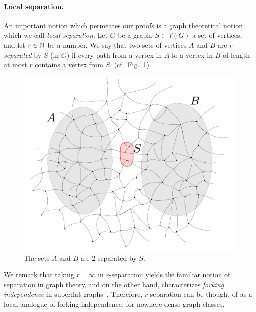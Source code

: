 \paragraph{Local separation.}
An important notion which permeates our proofs
is a graph theoretical notion which we call \emph{local separation}.
Let $G$ be a graph, $S\subset V(G)$ a set of vertices,
and let $r\in \mathbb{N}$ be a number. We say that two  sets of vertices $A$ and $B$  are \emph{$r$-separated} by $S$ (in $G$) if every path from a vertex in $A$ to a vertex in $B$
of length at most $r$ contains a vertex from $S$. 
(cf.~Fig.~\ref{fig:sep}).
 \begin{figure}[h!]
 	\centering
 		\includegraphics[scale=0.35,page=1]{pics}
 	\caption{The sets $A$ and $B$ are $2$-separated by $S$.
 	}
 	\label{fig:sep}
 \end{figure}
We remark that taking $r=\infty$ in $r$-separation yields the familiar notion of separation in graph theory,
and on the other hand, characterizes \emph{forking independence} in superflat graphs~\cite{ivanov}. Therefore,
$r$-separation can be thought of as a local analogue of forking independence, for nowhere dense graph classes.

